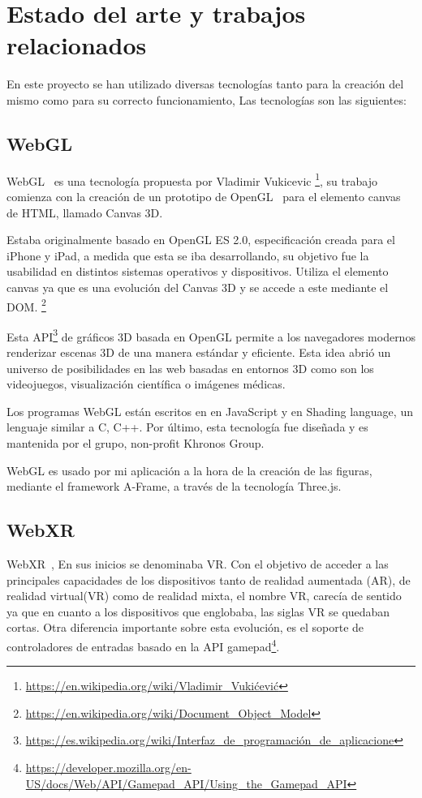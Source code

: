 \documentclass[a4paper, 12pt]{book}
\begin{document}
\cleardoublepage %
\chapter{Estado del arte y trabajos relacionados} %
\label{chap:objetivos} %
En este proyecto se han utilizado diversas tecnologías tanto para la creación del mismo como para su correcto funcionamiento, Las tecnologías son las siguientes:

\section{WebGL} %
\label{sec:WebGl}
WebGL~\cite{webGl} es una tecnología propuesta por Vladimir Vukicevic \footnote{\url{https://en.wikipedia.org/wiki/Vladimir_Vukićević}}, su trabajo comienza con la creación de un prototipo de OpenGL~\cite{openGL} para el elemento canvas de HTML, llamado Canvas 3D.

Estaba originalmente basado en OpenGL ES 2.0, especificación creada para el iPhone y iPad, a medida que esta se iba desarrollando, su objetivo fue la usabilidad en distintos sistemas operativos y dispositivos. Utiliza el elemento canvas ya que es una evolución del Canvas 3D y se accede a este mediante el DOM. \footnote{\url{https://en.wikipedia.org/wiki/Document_Object_Model}}

Esta API\footnote{\url{https://es.wikipedia.org/wiki/Interfaz_de_programación_de_aplicacione}} de gráficos 3D basada en OpenGL permite a los navegadores modernos renderizar escenas 3D de una manera estándar y eficiente. Esta idea abrió un universo de posibilidades en las web basadas en entornos 3D como son los videojuegos, visualización científica o imágenes médicas. 

Los programas WebGL están escritos en en JavaScript y en Shading language, un lenguaje similar a C, C++. Por último, esta tecnología fue diseñada y es mantenida por el grupo, non-profit Khronos Group.

WebGL es usado por mi aplicación a la hora de la creación de las figuras, mediante el framework A-Frame, a través de la tecnología Three.js.

\section{WebXR} %
\label{sec:WebXR}
WebXR~\cite{webXR}, En sus inicios se denominaba VR. Con el objetivo de acceder a las principales capacidades de los dispositivos tanto de realidad aumentada (AR), de realidad virtual(VR) como de realidad mixta, el nombre VR, carecía de sentido ya que en cuanto a los dispositivos que englobaba, las siglas VR se quedaban cortas. Otra diferencia importante sobre esta evolución, es el soporte de controladores de entradas basado en la API gamepad\footnote{\url{https://developer.mozilla.org/en-US/docs/Web/API/Gamepad_API/Using_the_Gamepad_API}}.
\end{document}
